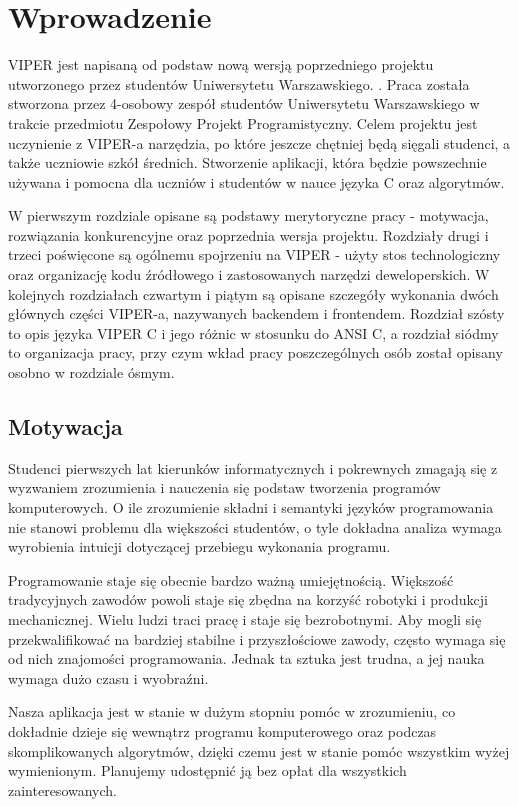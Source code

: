 \documentclass[a4paper,twoside,openright,11pt]{report}
\begin{document}
  \tableofcontents

  \chapter{Wprowadzenie}
\par VIPER jest napisaną od podstaw nową wersją poprzedniego projektu utworzonego przez studentów Uniwersytetu Warszawskiego. \cite{viper1}. Praca została stworzona przez 4-osobowy zespół studentów Uniwersytetu Warszawskiego w trakcie przedmiotu Zespołowy Projekt Programistyczny. Celem projektu jest uczynienie z VIPER-a narzędzia, po które jeszcze chętniej będą sięgali studenci, a także uczniowie szkół średnich. Stworzenie aplikacji, która będzie powszechnie używana i pomocna dla uczniów i studentów w nauce języka C oraz algorytmów. 
\par W pierwszym rozdziale opisane są podstawy merytoryczne pracy - motywacja, rozwiązania konkurencyjne oraz poprzednia wersja projektu. Rozdziały drugi i trzeci poświęcone są ogólnemu spojrzeniu na VIPER - użyty stos technologiczny oraz organizację kodu źródłowego i zastosowanych narzędzi deweloperskich. W kolejnych rozdziałach czwartym i piątym są opisane szczegóły wykonania dwóch głównych części VIPER-a, nazywanych backendem i frontendem. Rozdział szósty to opis języka VIPER C i jego różnic w stosunku do ANSI C, a rozdział siódmy to organizacja pracy, przy czym wkład pracy poszczególnych osób został opisany osobno w rozdziale ósmym.

  \section{Motywacja}
\par Studenci pierwszych lat kierunków informatycznych i pokrewnych zmagają się z wyzwaniem zrozumienia i nauczenia się podstaw tworzenia programów komputerowych. O ile zrozumienie składni i semantyki języków programowania nie stanowi problemu dla większości studentów, o tyle dokładna analiza wymaga wyrobienia intuicji dotyczącej przebiegu wykonania programu.
\par Programowanie staje się obecnie bardzo ważną umiejętnością. Większość tradycyjnych zawodów powoli staje się zbędna na korzyść robotyki i produkcji mechanicznej. Wielu ludzi traci pracę i staje się bezrobotnymi. Aby mogli się przekwalifikować na bardziej stabilne i przyszłościowe zawody, często wymaga się od nich znajomości programowania. Jednak ta sztuka jest trudna, a jej nauka wymaga dużo czasu i wyobraźni. 
\par Nasza aplikacja jest w stanie w dużym stopniu pomóc w zrozumieniu, co dokładnie dzieje się wewnątrz programu komputerowego oraz podczas skomplikowanych algorytmów, dzięki czemu jest w stanie pomóc wszystkim wyżej wymienionym. Planujemy udostępnić ją bez opłat dla wszystkich zainteresowanych.
\end{document}
